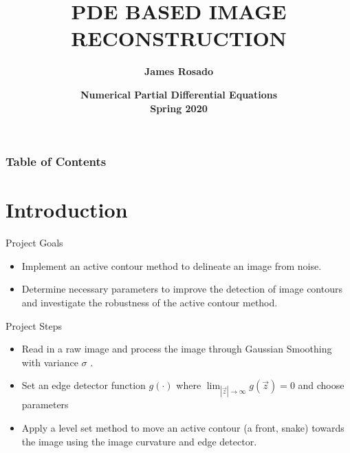 \documentclass[xcolor=dvipsnames]{beamer}
\title[NUMPDE] %
{\textbf{PDE BASED IMAGE RECONSTRUCTION}}
\author[Rosado, James] %
{\large{\textbf{James Rosado}}}
\date%
{\large{\textbf{ Numerical Partial Differential Equations\\ Spring 2020}}}
\begin{document}

\frame{\titlepage}




\begin{frame}
\frametitle{Table of Contents}
{\Large
\tableofcontents}
\end{frame}



\section{Introduction}
\begin{frame}{Project Goals}
    \begin{itemize}
        \item Implement an active contour method to delineate an image from noise.
        \item Determine necessary parameters to improve the detection of image contours and investigate the robustness of the active contour method. 
    \end{itemize}
\end{frame}

\begin{frame}{Project Steps}
\begin{itemize}
    \item Read in a raw image and process the image through Gaussian Smoothing with variance $\sigma$ \cite{osher2006level}.
    \item Set an edge detector function $g(\cdot)$ where $\displaystyle \lim_{|\vec{z}|\rightarrow\infty}g(\vec{z})=0$ and choose parameters \cite{osher2006level}
    \item Apply a level set method to move an active contour (a front, snake) towards the image using the image curvature and edge detector.
\end{itemize}
\end{frame}
\end{document}
